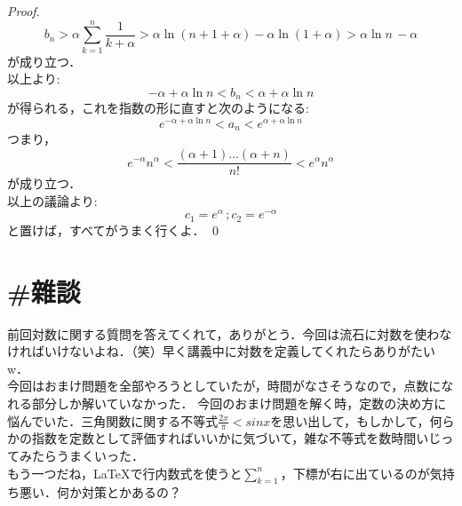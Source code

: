 \documentclass{jarticle}
\begin{document}
\begin{proof}
$$
b_n > \alpha \sum_{k=1}^{n} \frac{1}{k+\alpha} > \alpha \ln (n+1+\alpha) - \alpha \ln (1+\alpha)> \alpha \ln n \, -\alpha
$$
が成り立つ．\\
以上より:\\
$$
-\alpha + \alpha \ln n < b_n < \alpha + \alpha \ln n
$$
が得られる，これを指数の形に直すと次のようになる:\\
$$
e^{-\alpha + \alpha \ln n}< a_n <e^{\alpha + \alpha \ln n}
$$
つまり，
$$
e^{-\alpha }n^{\alpha}< \frac{(\alpha +1)...(\alpha +n)}{n!}<e^{\alpha}n^{\alpha}
$$
が成り立つ．\\
以上の議論より:\\
$$
c_1 =e^{\alpha} \, ;c_2 =e^{-\alpha}
$$
と置けば，すべてがうまく行くよ．
\qed
\end{proof}
\section*{\#雜談}
前回対数に関する質問を答えてくれて，ありがとう．今回は流石に対数を使わなければいけないよね．（笑）早く講義中に対数を定義してくれたらありがたいw．\\
今回はおまけ問題を全部やろうとしていたが，時間がなさそうなので，点数になれる部分しか解いていなかった．
今回のおまけ問題を解く時，定数の決め方に悩んでいた．三角関数に関する不等式$\frac{2x}{\pi} < sinx$を思い出して，もしかして，何らかの指数を定数として評価すればいいかに気づいて，雑な不等式を数時間いじってみたらうまくいった．\\
もう一つだね，\LaTeX で行内数式を使うと$\sum_{k=1}^{n}$，下標が右に出ているのが気持ち悪い．何か対策とかあるの？
\end{document}
